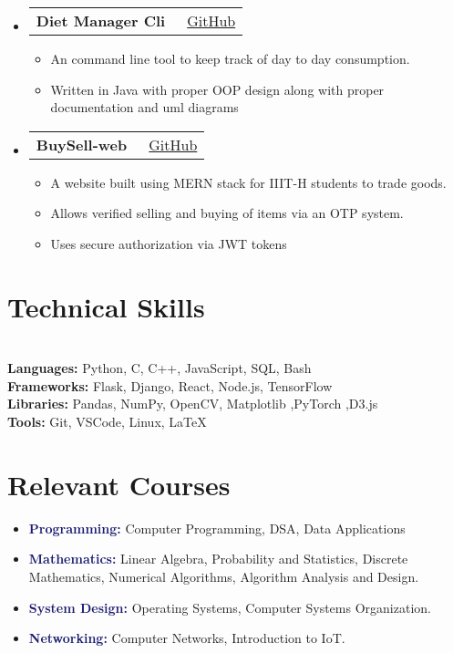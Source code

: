 \documentclass[a4paper,10pt]{article}
\makeatletter
\newcommand{\resumeItem}[1]{\item[\textcolor{bulletcolor}{\textbullet}] \small{#1}}
\newcommand{\resumeProjectHeading}[2]{
    \item
    \begin{tabular*}{0.97\textwidth}{l@{\extracolsep{\fill}}r}
        \textbf{#1} & {\small #2} \\
    \end{tabular*}\vspace{-7pt}
}
\makeatother
\begin{document}
\begin{itemize}[leftmargin=0.15in, label={}]
        
    \resumeProjectHeading
        {\textbf{Diet Manager Cli}}{{\small\faGithub}\ \href{https://github.com/mayank3135432/diet_manager-cli}{GitHub}}
        \begin{itemize}[leftmargin=0.15in]
            \resumeItem{An command line tool to keep track of day to day consumption.}
            \resumeItem{Written in Java with proper OOP design along with proper documentation and uml diagrams}
        \end{itemize}
        
    \resumeProjectHeading
        {\textbf{BuySell-web}}{{\small\faGithub}\ \href{https://github.com/mayank3135432/BUYSELL-web}{GitHub}}
        \begin{itemize}[leftmargin=0.15in]
            \resumeItem{A website built using MERN stack for IIIT-H students to trade goods.}
            \resumeItem{Allows verified selling and buying of items via an OTP system.}
            \resumeItem{Uses secure authorization via JWT tokens}
        \end{itemize}


\end{itemize}

\section{Technical Skills}
\begin{multicols}{2}
\textbf{}\\
\textbf{Languages:} Python, C, C++, JavaScript, SQL, Bash \\
\textbf{Frameworks:} Flask, Django, React, Node.js, TensorFlow \\
\textbf{Libraries:} Pandas, NumPy, OpenCV, Matplotlib ,PyTorch ,D3.js \\
\textbf{Tools:} Git, VSCode, Linux, LaTeX \\
\end{multicols}

\section{\textcolor{headercolor}{Relevant Courses}}
\begin{multicols}{2}
    \begin{itemize}[leftmargin=0.15in, label={}]
        \item \textbf{\textcolor{MidnightBlue}{Programming:}} Computer Programming, DSA, Data Applications
        \item \textbf{\textcolor{MidnightBlue}{Mathematics:}} Linear Algebra, Probability and Statistics, Discrete Mathematics, Numerical Algorithms, Algorithm Analysis and Design.
        \item \textbf{\textcolor{MidnightBlue}{System Design:}} Operating Systems, Computer Systems Organization.
        \item \textbf{\textcolor{MidnightBlue}{Networking:}} Computer Networks, Introduction to IoT.
    \end{itemize}
\end{multicols}
\end{document}
